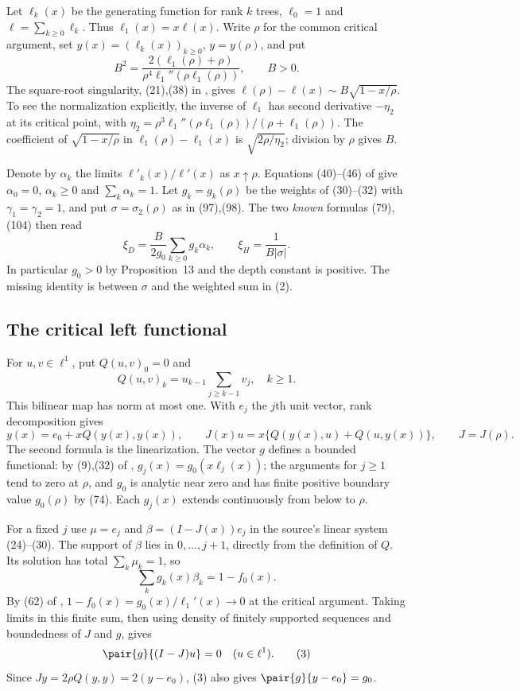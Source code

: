 \documentclass[11pt,a4paper]{article}
\numberwithin{equation}{section}
\theoremstyle{definition}
\theoremstyle{remark}
\begin{document}
Let $\ell_k(x)$ be the generating function for rank $k$ trees, $\ell_0=1$ and $\ell=\sum_{k\ge0}\ell_k$. Thus $\ell_1(x)=x\ell(x)$. Write $\rho$ for the common critical argument, set $y(x)=(\ell_k(x))_{k\ge0}$, $y=y(\rho)$, and put
\[
 B^2=\frac{2(\ell_1(\rho)+\rho)}
             {\rho^4\ell_1''(\rho\ell_1(\rho))},\qquad B>0.
 \tag{1}
\]
The square-root singularity, (21),(38) in \cite{r49taisho:N}, gives
$\ell(\rho)-\ell(x)\sim B\sqrt{1-x/\rho}$. To see the normalization explicitly, the inverse of $\ell_1$ has second derivative $-\eta_2$ at its critical point, with
$\eta_2=\rho^3\ell_1''(\rho\ell_1(\rho))/(\rho+\ell_1(\rho))$.
The coefficient of $\sqrt{1-x/\rho}$ in $\ell_1(\rho)-\ell_1(x)$ is $\sqrt{2\rho/\eta_2}$; division by $\rho$ gives $B$.

Denote by $\alpha_k$ the limits $\ell'_k(x)/\ell'(x)$ as $x\uparrow\rho$. Equations (40)--(46) of \cite{r49taisho:N} give $\alpha_0=0$, $\alpha_k\ge0$ and $\sum_k\alpha_k=1$. Let $g_k=g_k(\rho)$ be the weights of (30)--(32) with $\gamma_1=\gamma_2=1$, and put $\sigma=\sigma_2(\rho)$ as in (97),(98). The two \emph{known} formulas (79),(104) then read
\[
 \xi_D=\frac{B}{2g_0}\sum_{k\ge0}g_k\alpha_k,\qquad
 \xi_H=\frac1{B|\sigma|}.
 \tag{2}
\]
In particular $g_0>0$ by Proposition~13 and the depth constant is positive. The missing identity is between $\sigma$ and the weighted sum in (2).

\subsection{The critical left functional}
For $u,v\in\ell^1$, put $Q(u,v)_0=0$ and
\[
 Q(u,v)_k=u_{k-1}\sum_{j\ge k-1}v_j,\quad k\ge1.
\]
This bilinear map has norm at most one. With $e_j$ the $j$th unit vector, rank decomposition gives
\[
 y(x)=e_0+xQ(y(x),y(x)),\qquad
 J(x)u=x\{Q(y(x),u)+Q(u,y(x))\},\qquad J=J(\rho).
\]
The second formula is the linearization. The vector $g$ defines a bounded functional: by (9),(32) of \cite{r49taisho:N}, $g_j(x)=g_0(x\ell_j(x))$; the arguments for $j\ge1$ tend to zero at $\rho$, and $g_0$ is analytic near zero and has finite positive boundary value $g_0(\rho)$ by (74). Each $g_j(x)$ extends continuously from below to $\rho$.

For a fixed $j$ use $\mu=e_j$ and $\beta=(I-J(x))e_j$ in the source's linear system (24)--(30). The support of $\beta$ lies in $0,\ldots,j+1$, directly from the definition of $Q$. Its solution has total $\sum_k\mu_k=1$, so
\[
 \sum_k g_k(x)\beta_k=1-f_0(x).
\]
By (62) of \cite{r49taisho:N}, $1-f_0(x)=g_0(x)/\ell_1'(x)\to0$ at the critical argument. Taking limits in this finite sum, then using density of finitely supported sequences and boundedness of $J$ and $g$, gives
\[
 \pair{g}{(I-J)u}=0\quad (u\in\ell^1).
 \tag{3}
\]
Since $Jy=2\rho Q(y,y)=2(y-e_0)$, (3) also gives $\pair{g}{y-e_0}=g_0$.
\end{document}
